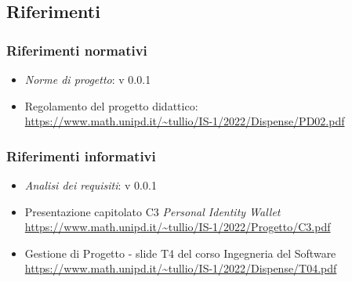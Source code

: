 \subsection{Riferimenti}

\subsubsection{Riferimenti normativi}
\begin{itemize}
    \item \textit{Norme di progetto}: v 0.0.1
    \item Regolamento del progetto didattico: \\
    \url{https://www.math.unipd.it/~tullio/IS-1/2022/Dispense/PD02.pdf}
\end{itemize}

\subsubsection{Riferimenti informativi}
\begin{itemize}
    \item \textit{Analisi dei requisiti}: v 0.0.1
    \item Presentazione capitolato C3 \textit{Personal Identity Wallet} \\ \url{https://www.math.unipd.it/~tullio/IS-1/2022/Progetto/C3.pdf}
    \item Gestione di Progetto - slide T4 del corso Ingegneria del Software \\ \url{https://www.math.unipd.it/~tullio/IS-1/2022/Dispense/T04.pdf}
\end{itemize}


